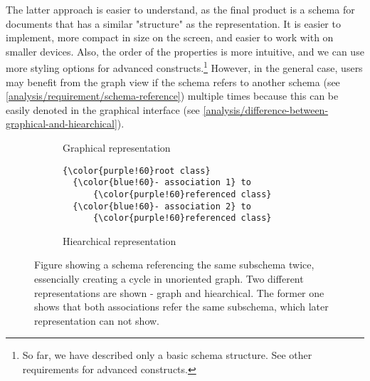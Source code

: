The latter approach is easier to understand, as the final product is a schema for documents that has a similar "structure" as the representation. It is easier to implement, more compact in size on the screen, and easier to work with on smaller devices. Also, the order of the properties is more intuitive, and we can use more styling options for advanced constructs.\footnote{So far, we have described only a basic schema structure. See other requirements for advanced constructs.} However, in the general case, users may benefit from the graph view if the schema refers to another schema (see \autoref{analysis/requirement/schema-reference}) multiple times because this can be easily denoted in the graphical interface (see \autoref{analysis/difference-between-graphical-and-hiearchical}).

\begin{figure}[h!]\centering
  \begin{subfigure}{.5\textwidth}
      \centering
      \caption{Graphical representation}
    \end{subfigure}%
    \begin{subfigure}{.5\textwidth}
\begin{Verbatim}[commandchars=\\\{\}]
{\color{purple!60}root class}
  {\color{blue!60}- association 1} to
      {\color{purple!60}referenced class}
  {\color{blue!60}- association 2} to
      {\color{purple!60}referenced class}
\end{Verbatim}
      \caption{Hiearchical representation}
    \end{subfigure}

  \caption{Figure showing a schema referencing the same subschema twice, essencially creating a cycle in unoriented graph. Two different representations are shown - graph and hiearchical.  The former one shows that both associations refer the same subschema, which later representation can not show.}
  \label{analysis/difference-between-graphical-and-hiearchical}
\end{figure}

